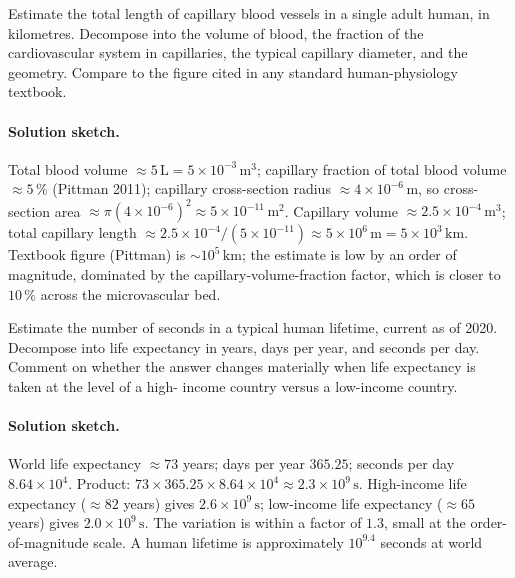 \begin{exercise}
Estimate the total length of capillary blood vessels in a single
adult human, in kilometres. Decompose into the volume of blood, the
fraction of the cardiovascular system in capillaries, the typical
capillary diameter, and the geometry. Compare to the figure cited
in any standard human-physiology textbook.
\end{exercise}

\paragraph{Solution sketch.}
Total blood volume $\approx 5 \,\si{\liter} = 5 \times 10^{-3}
\,\si{\meter\cubed}$; capillary fraction of total blood volume
$\approx 5\,\%$ (Pittman 2011); capillary cross-section radius
$\approx 4 \times 10^{-6} \,\si{\meter}$, so cross-section area
$\approx \pi (4 \times 10^{-6})^{2} \approx 5 \times 10^{-11}
\,\si{\meter\squared}$. Capillary volume $\approx 2.5 \times 10^{-4}
\,\si{\meter\cubed}$; total capillary length $\approx 2.5 \times
10^{-4} / (5 \times 10^{-11}) \approx 5 \times 10^{6} \,\si{\meter}
= 5 \times 10^{3} \,\si{\kilo\meter}$. Textbook figure (Pittman)
is $\sim 10^{5} \,\si{\kilo\meter}$; the estimate is low by an
order of magnitude, dominated by the capillary-volume-fraction
factor, which is closer to $10\,\%$ across the microvascular bed.

\begin{exercise}
Estimate the number of seconds in a typical human lifetime, current
as of 2020. Decompose into life expectancy in years, days per year,
and seconds per day. Comment on whether the answer changes
materially when life expectancy is taken at the level of a high-
income country versus a low-income country.
\end{exercise}

\paragraph{Solution sketch.}
World life expectancy $\approx 73$ years; days per year $365.25$;
seconds per day $8.64 \times 10^{4}$. Product:
$73 \times 365.25 \times 8.64 \times 10^{4} \approx 2.3 \times
10^{9} \,\si{\second}$. High-income life expectancy
($\approx 82$ years) gives $2.6 \times 10^{9} \,\si{\second}$;
low-income life expectancy ($\approx 65$ years) gives $2.0 \times
10^{9} \,\si{\second}$. The variation is within a factor of $1.3$,
small at the order-of-magnitude scale. A human lifetime is
approximately $10^{9.4}$ seconds at world average.


